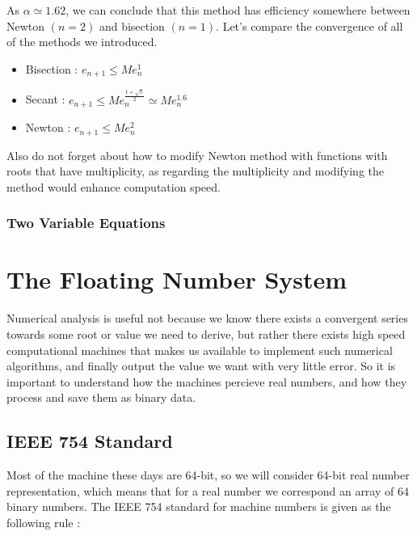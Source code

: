 \documentclass[paper=a4, fontsize=11pt]{scrartcl}
\begin{document}
As $\alpha \simeq 1.62$, we can conclude that this method has efficiency somewhere between Newton $(n=2)$ and bisection $(n=1)$. Let's compare the convergence of all of the methods we introduced.\\

\begin{itemize}
	\item Bisection : $e_{n+1} \leq M e_n^1$ 
	\item Secant :  $e_{n+1} \leq M e_n^\frac{1+\sqrt{5}}{2} \simeq M e_n^{1.6} $ 
	\item Newton : $e_{n+1} \leq M e_n^2$ \\
\end{itemize}

Also do not forget about how to modify Newton method with functions with roots that have multiplicity, as regarding the multiplicity and modifying the method would enhance computation speed.

\vspace{0.15in}
\subsubsection{Two Variable Equations}
\vspace{0.15in}

\vspace{0.25in}

\section{The Floating Number System}
\vspace{0.25in}

Numerical analysis is useful not because we know there exists a convergent series towards some root or value we need to derive, but rather there exists high speed computational machines that makes us available to implement such numerical algorithms, and finally output the value we want with very little error. So it is important to understand how the machines percieve real numbers, and how they process and save them as binary data.

\vspace{0.15in}

\subsection{IEEE 754 Standard}
\vspace{0.15in}

Most of the machine these days are 64-bit, so we will consider 64-bit real number representation, which means that for a real number we correspond an array of 64 binary numbers. The IEEE 754 standard for machine numbers is given as the following rule :\\
\end{document}
